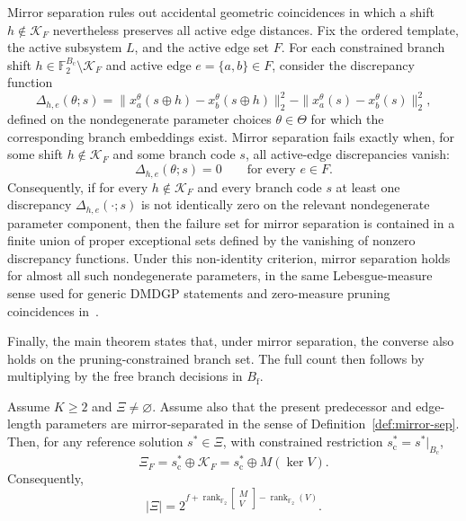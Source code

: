 \begin{remark}
\label{rem:mirror-separation-genericity}
Mirror separation rules out accidental geometric coincidences in which a shift $h\notin\mathcal{K}_F$ nevertheless preserves all active edge distances. Fix the ordered template, the active subsystem $L$, and the active edge set $F$. For each constrained branch shift $h\in\mathbb{F}_2^{B_{\mathrm{c}}}\setminus\mathcal{K}_F$ and active edge $e=\{a,b\}\in F$, consider the discrepancy function
\[
\Delta_{h,e}(\theta;s)
=
\|x^\theta_a(s\oplus h)-x^\theta_b(s\oplus h)\|_2^2
-
\|x^\theta_a(s)-x^\theta_b(s)\|_2^2,
\]
defined on the nondegenerate parameter choices $\theta\in\Theta$ for which the corresponding branch embeddings exist. Mirror separation fails exactly when, for some shift $h\notin\mathcal{K}_F$ and some branch code $s$, all active-edge discrepancies vanish:
\[
\Delta_{h,e}(\theta;s)=0
\qquad
\text{for every } e\in F.
\]
Consequently, if for every $h\notin\mathcal{K}_F$ and every branch code $s$ at least one discrepancy $\Delta_{h,e}(\cdot;s)$ is not identically zero on the relevant nondegenerate parameter component, then the failure set for mirror separation is contained in a finite union of proper exceptional sets defined by the vanishing of nonzero discrepancy functions. Under this non-identity criterion, mirror separation holds for almost all such nondegenerate parameters, in the same Lebesgue-measure sense used for generic DMDGP statements and zero-measure pruning coincidences in~\cite{liberti2012discretizable}.
\end{remark}

Finally, the main theorem states that, under mirror separation, the converse also holds on the pruning-constrained branch set. The full count then follows by multiplying by the free branch decisions in $B_{\mathrm{f}}$.

\begin{theorem}
\label{thm:main}
Assume $K \ge 2$ and $\Xi \ne \varnothing$. Assume also that the present predecessor and edge-length parameters are mirror-separated in the sense of Definition~\ref{def:mirror-sep}. Then, for any reference solution $s^\ast \in \Xi$, with constrained restriction $s^\ast_{\mathrm{c}}=s^\ast|_{B_{\mathrm{c}}}$,
\[
\Xi_F
=
s^\ast_{\mathrm{c}} \oplus \mathcal{K}_F
=
s^\ast_{\mathrm{c}} \oplus M(\ker V).
\]
Consequently,
\[
\lvert \Xi\rvert
=
2^{
f+
\operatorname{rank}_{\mathbb{F}_2}\begin{bmatrix} M \\ V \end{bmatrix}
-
\operatorname{rank}_{\mathbb{F}_2}(V)
}.
\]
\end{theorem}

